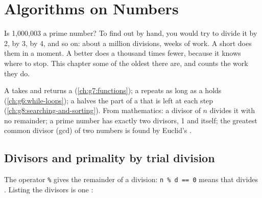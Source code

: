 \chapter{Algorithms on Numbers}\label{ch:g9:algorithms-on-numbers}

Is 1,000,003 a prime number? To find out by hand, you would try to divide it
by 2, by 3, by 4, and so on: about a million divisions, weeks of work. A short
 does them in a moment. A better  does a thousand times fewer,
because it knows where to stop. This chapter  some of the oldest
 there are, and counts the work they do.

\begin{recall}
A  takes  and returns a 
(\cref{ch:g7:functions}); a   repeats as long as a 
holds (\cref{ch:g6:while-loops}); a  halves the part of a  that is left at each step (\cref{ch:g8:searching-and-sorting}). From
mathematics: a divisor of $n$ divides it with no remainder; a prime number has
exactly two divisors, 1 and itself; the greatest common divisor (gcd) of two
numbers is found by Euclid's .
\end{recall}

\section{Divisors and primality by trial division}

The operator \texttt{\%} gives the remainder of a division: \texttt{n \% d == 0}
means that  divides . Listing the divisors is one :

\label{lst:g9:algorithms-on-numbers:divisors}

